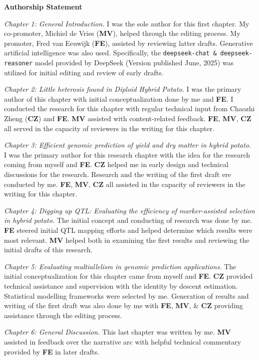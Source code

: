 \textbf{Authorship Statement}

\textit{Chapter 1: General Introduction.} I was the sole author for this first chapter. My co-promoter, Michiel de Vries (\textbf{MV}), helped through the editing process. My promoter, Fred van Eeuwijk (\textbf{FE}), assisted by reviewing latter drafts. Generative artificial intelligence was also used. Specifically, the \texttt{deepseek-chat \& deepseek-reasoner} model provided by DeepSeek (Version published June, 2025) was utilized for initial editing and review of early drafts.

\textit{Chapter 2: Little heterosis found in Diploid Hybrid Potato.} I was the primary author of this chapter with initial conceptualization done by me and \textbf{FE}. I conducted the research for this chapter with regular technical input from Chaozhi Zheng (\textbf{CZ}) and \textbf{FE}. \textbf{MV} assisted with content-related feedback. \textbf{FE}, \textbf{MV}, \textbf{CZ} all served in the capacity of reviewers in the writing for this chapter.

\textit{Chapter 3: Efficient genomic prediction of yield and dry matter in hybrid potato.} I was the primary author for this research chapter with the idea for the research coming from myself and \textbf{FE}. \textbf{CZ} helped me in early design and technical discussions for the research. Research and the writing of the first draft ere conducted by me. \textbf{FE}, \textbf{MV}, \textbf{CZ} all assisted in the capacity of reviewers in the writing for this chapter.

\textit{Chapter 4: Digging up QTL: Evaluating the efficiency of marker-assisted selection in hybrid potato.} The initial concept and conducting of research was done by me. \textbf{FE} steered initial QTL mapping efforts and helped determine which results were most relevant. \textbf{MV} helped both in examining the first results and reviewing the initial drafts of this research.

\textit{Chapter 5: Evaluating multiallelism in genomic prediction applications.} The initial conceptualization for this chapter came from myself and \textbf{FE}. \textbf{CZ} provided technical assistance and supervision with the identity by descent estimation. Statistical modelling frameworks were selected by me. Generation of results and writing of the first draft was also done by me with \textbf{FE}, \textbf{MV}, \& \textbf{CZ} providing assistance through the editing process.

\textit{Chapter 6: General Discussion.} This last chapter was written by me. \textbf{MV} assisted in feedback over the narrative arc with helpful technical commentary provided by \textbf{FE} in later drafts.
